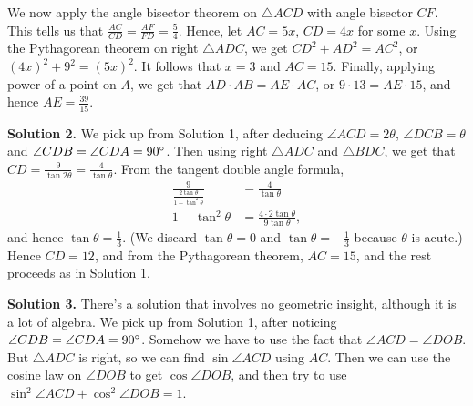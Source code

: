 \documentclass[11pt,paper=letter]{scrartcl}
\newcommand{\soln}[1]{{\sffamily \bfseries Solution #1.}\;}
\begin{document}
\begin{enumerate}[align=left,leftmargin=*]
We now apply the angle bisector theorem on $\triangle ACD$ with angle bisector $CF$. This tells us that $\frac{AC}{CD} = \frac{AF}{FD} = \frac{5}{4}$. Hence, let $AC = 5x$, $CD = 4x$ for some $x$. Using the Pythagorean theorem on right $\triangle ADC$, we get $CD^2 + AD^2 = AC^2$, or $(4x)^2 + 9^2 = (5x)^2$. It follows that $x = 3$ and $AC = 15$. Finally, applying power of a point on $A$, we get that $AD \cdot AB = AE \cdot AC$, or $9 \cdot 13 = AE  \cdot 15$, and hence $AE = \frac{39}{15}$.

\soln2 We pick up from Solution 1, after deducing $\angle ACD = 2\theta$, $\angle DCB = \theta$ and $\angle CDB = \angle CDA = 90^\circ$. Then using right $\triangle ADC$ and $\triangle BDC$, we get that $CD = \frac{9}{\tan 2\theta} = \frac{4}{\tan \theta}$. From the tangent double angle formula,
\begin{align*}
\frac{9}{\frac{2\tan \theta}{1 - \tan^2\theta}}
&= \frac{4}{\tan\theta} \\
1 - \tan^2 \theta &= \frac{4 \cdot 2 \tan \theta}{9 \tan \theta},
\end{align*}
and hence $\tan \theta = \frac{1}{3}$. (We discard $\tan \theta = 0$ and $\tan \theta = -\frac{1}{3}$ because $\theta$ is acute.) Hence $CD = 12$, and from the Pythagorean theorem, $AC = 15$, and the rest proceeds as in Solution 1.

\soln3 There's a solution that involves no geometric insight, although it is a lot of algebra. We pick up from Solution 1, after noticing $\angle CDB = \angle CDA = 90^\circ$. Somehow we have to use the fact that $\angle ACD = \angle DOB$. But $\triangle ADC$ is right, so we can find $\sin \angle ACD$ using $AC$. Then we can use the cosine law on $\angle DOB$ to get $\cos \angle DOB$, and then try to use $\sin^2 \angle ACD + \cos^2 \angle DOB = 1$.


\end{enumerate}
\end{document}

